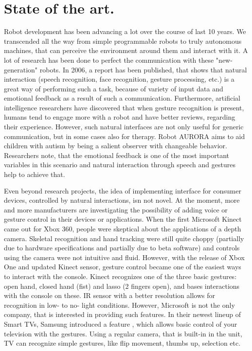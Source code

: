 \documentclass[a4paper,11pt,oneside]{article}
\begin{document}
\section{State of the art.}

Robot development has been advancing a lot over the course of last 10 years. We transcended all the way from simple programmable robots to truly autonomous machines, that can perceive the environment around them and interact with it. A lot of research has been done to perfect the communication with these "new-generation" robots. In 2006, a report \cite{SA01} has been published, that shows that natural interaction (speech recognition, face recognition, gesture processing, etc.) is a great way of performing such a task, because of variety of input data and emotional feedback as a result of such a communication. Furthermore, artificial intelligence researchers \cite{SA02} have discovered that when gesture recognition is present, humans tend to engage more with a robot and have better reviews, regarding their experience. However, such natural interfaces are not only useful for generic communication, but in some cases also for therapy. Robot AURORA \cite{SA03} aims to aid children with autism by being a salient observer with changeable behavior. Researchers note, that the emotional feedback is one of the most important variables in this scenario and natural interaction through speech and gestures help to achieve that.

Even beyond research projects, the idea of implementing interface for consumer devices, controlled by natural interactions, isn not novel. At the moment, more and more manufacturers are investigating the possibility of adding voice or gesture control in their devices or applications. When the first Microsoft Kinect came out for Xbox 360, people were skeptical about the applications of a depth camera. Skeletal recognition and hand tracking were still quite choppy (partially due to hardware specifications and partially due to beta software) and controls using the camera were not intuitive and fluid. However, with the release of Xbox One and updated Kinect sensor, gesture control became one of the easiest ways to interact with the console. Kinect recognizes one of the three basic gestures: open hand, closed hand (fist) and lasso (2 fingers open), and bases interactions with the console on these. IR sensor with a better resolution allows for recognition in low- to no- light conditions. However, Microsoft is not the only company, that is interested in providing such features. In their newest lineup of Smart TVs, Samsung introduced a feature \cite{SM01}, which allows basic control of your television with the gestures. Using a regular camera, that is built-in in the unit, TV can recognize simple gestures, like flip movement, thumbs up, selection etc.
\end{document}
